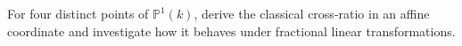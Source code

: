 \begin{problem}\label{chal:vi36-02}
For four distinct points of \(\mathbb P^1(k)\), derive the classical cross-ratio in an affine coordinate and investigate how it behaves under fractional linear transformations.
\end{problem}
